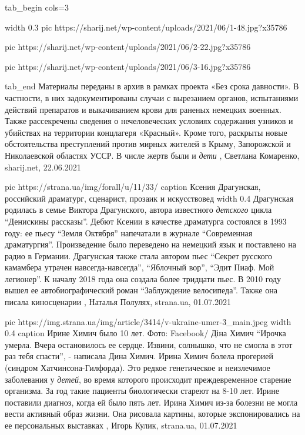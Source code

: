 \ifcmt
  tab_begin cols=3

     width 0.3
     pic https://sharij.net/wp-content/uploads/2021/06/1-48.jpg?x35786

     pic https://sharij.net/wp-content/uploads/2021/06/2-22.jpg?x35786

     pic https://sharij.net/wp-content/uploads/2021/06/3-16.jpg?x35786

  tab_end
\fi
Материалы переданы в архив в рамках проекта «Без срока давности». В частности,
в них задокументированы случаи с вырезанием органов, испытаниями действий
препаратов и выкачиванием крови для раненых немецких военных.  Также
рассекречены сведения о нечеловеческих условиях содержания узников и убийствах
на территории концлагеря «Красный». Кроме того, раскрыты новые обстоятельства
преступлений против мирных жителей в Крыму, Запорожской и Николаевской областях
УССР. В числе жертв были и \emph{дети}
, 
Светлана Комаренко, sharij.net, 22.06.2021

\ifcmt
  pic https://strana.ua/img/forall/u/11/33/%
  caption Ксения Драгунская, российский драматург, сценарист, прозаик и искусствовед
  width 0.4
\fi
Драгунская родилась в семье Виктора Драгунского, автора известного
\emph{детского} цикла \enquote{Денискины рассказы}.  Дебют Ксении в качестве
драматурга состоялся в 1993 году: ее пьесу \enquote{Земля Октября} напечатали в
журнале \enquote{Современная драматургия}. Произведение было переведено на
немецкий язык и поставлено на радио в Германии.  Драгунская также стала
автором пьес \enquote{Секрет русского камамбера утрачен навсегда-навсегда},
\enquote{Яблочный вор}, \enquote{Эдит Пиаф. Мой легионер}. К началу 2018 года
она создала более тридцати пьес.  В 2010 году вышел ее автобиографический роман
\enquote{Заблуждение велосипеда}. Также она писала киносценарии
, Наталья Полулях, strana.ua, 01.07.2021

\ifcmt
  pic https://img.strana.ua/img/article/3414/v-ukraine-umer-3_main.jpeg
  width 0.4
  caption Ирине Химич было 10 лет. Фото: Facebook/ Діна Химич 
\fi
\enquote{Ирочка умерла. Вчера остановилось ее сердце. Извини, солнышко, что не смогла в
этот раз тебя спасти}, - написала Дина Химич.
Ирина Химич болела прогерией (синдром Хатчинсона-Гилфорда). Это редкое
генетическое и неизлечимое заболевания у \emph{детей}, во время которого происходит
преждевременное старение организма. За год такие пациенты биологически стареют
на 8-10 лет. Ирине поставили диагноз, когда ей было пять лет. 
Ирина Химич из-за болезни не могла вести активный образ жизни. Она рисовала
картины, которые экспонировались на ее персональных выставках
, 
Игорь Кулик, strana.ua, 01.07.2021

